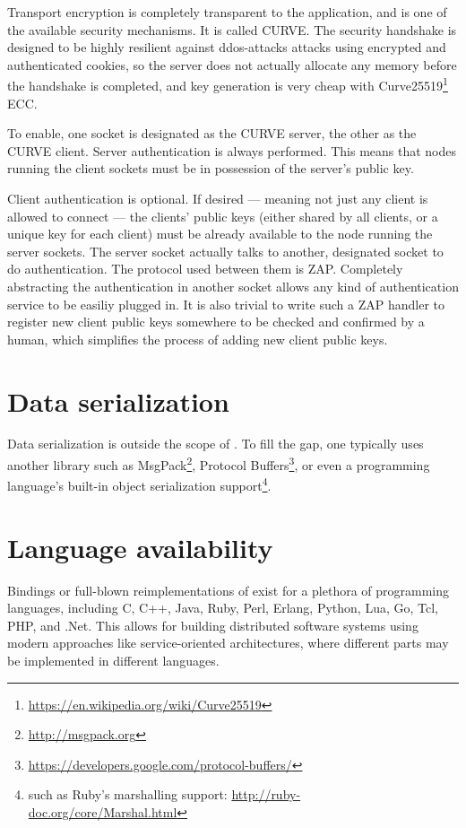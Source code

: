 Transport encryption is completely transparent to the application, and is one
of the available security mechanisms. It is called CURVE. The
security handshake is designed to be highly resilient against
\glspl{ddos-attack} attacks using encrypted and authenticated cookies, so the
server does not actually allocate any memory before the handshake is completed,
and key generation is very cheap \cite[p.~2]{djb:ed25519} with
Curve25519\footnote{\url{https://en.wikipedia.org/wiki/Curve25519}} \gls{ECC}.

To enable, one socket is designated as the CURVE server, the other as the CURVE client.
Server authentication is always performed. This means that nodes running the
client sockets must be in possession of the server's public key.

Client authentication is optional. If desired --- meaning not just any client
is allowed to connect --- the clients' public keys (either shared by all
clients, or a unique key for each client) must be already available to the node
running the server sockets. The server socket actually talks to another,
designated socket to do authentication. The protocol used between them is
\gls{ZAP}. Completely abstracting the authentication in another socket allows
any kind of authentication service to be easiliy plugged in. It is also trivial
to write such a ZAP handler to register new client public keys somewhere to be
checked and confirmed by a human, which simplifies the process of adding new
client public keys.



\section{Data serialization}
Data serialization is outside the scope of \zmq. To fill the gap, one typically
uses another library such as MsgPack\footnote{\url{http://msgpack.org}},
Protocol
Buffers\footnote{\url{https://developers.google.com/protocol-buffers/}}, or
even a programming language's built-in object serialization
support\footnote{such as Ruby's marshalling support:
\url{http://ruby-doc.org/core/Marshal.html}}.

\section{Language availability}
Bindings or full-blown reimplementations of \zmq exist for a plethora of
programming languages, including C, C++, Java, Ruby, Perl, Erlang, Python, Lua,
Go, Tcl, PHP, and .Net. This allows for building distributed software systems
using modern approaches like service-oriented architectures, where different
parts may be implemented in different languages.

